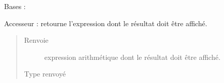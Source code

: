 \documentclass[letterpaper,10pt,french]{sphinxmanual}
\begin{document}
\begin{fulllineitems}
\label{\detokenize{structuresnodes:structuresnodes.PrintNode}}
Bases : {\hyperref[\detokenize{structuresnodes:structuresnodes.StructureNode}]{}}

\begin{fulllineitems}
\label{\detokenize{structuresnodes:structuresnodes.PrintNode.expression}}
Accesseur : retourne l’expression dont le résultat doit être affiché.
\begin{quote}\begin{description}
\item[{Renvoie}] \leavevmode
expression arithmétique dont le résultat doit être affiché.

\item[{Type renvoyé}] \leavevmode
{\hyperref[\detokenize{arithmeticexpressionnodes:arithmeticexpressionnodes.ArithmeticExpressionNode}]{}}

\end{description}\end{quote}

\end{fulllineitems}


\end{fulllineitems}

\end{document}
